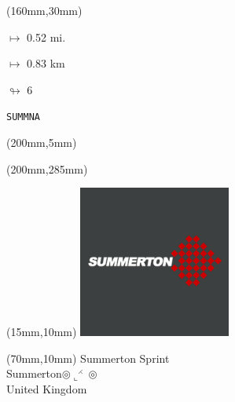 \begin{textblock*}{40mm}(160mm,30mm)%
\Large
\par$\mapsto$ 0.52 mi.
\par$\mapsto$ 0.83 km
\par$\looparrowright$ 6
\par\hfill\tiny\tt SUMMNA\\
\end{textblock*}
\begin{textblock*}{20mm}(200mm,5mm)%
\fbox{\thepage}
\label{SUMMNA}
\end{textblock*}
\begin{textblock*}{20mm}(200mm,285mm)%
\fbox{\thepage}
\end{textblock*}

\null\newpage
\begin{textblock*}{50mm}(15mm,10mm)%
\includegraphics[width=50mm]{LG/SUMM.png}
\end{textblock*}
\begin{textblock*}{130mm}(70mm,10mm)%
{\fontsize{20}{20}\selectfont Summerton Sprint\\}
{\fontsize{16}{16}\selectfont Summerton\hfill $\circledcirc\llcorner^{\rightthreetimes}\circledcirc$\\}
{\fontsize{12}{12}\selectfont United Kingdom\\}
\end{textblock*}

